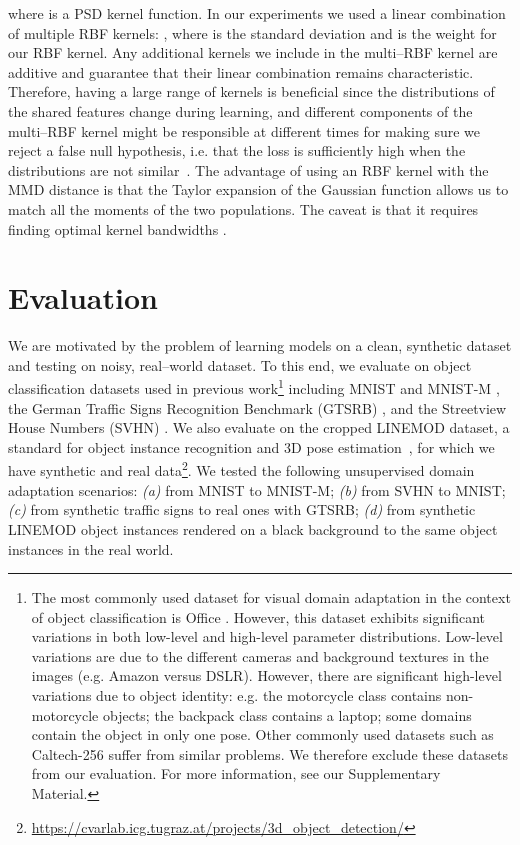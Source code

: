 \documentclass{article}
\begin{document}
where  is a PSD kernel function. In our experiments we used a linear combination of multiple RBF kernels: , where  is the standard deviation and  is the weight for our  RBF kernel. Any additional kernels we include in the multi--RBF kernel are additive and guarantee that their linear combination remains characteristic. Therefore, having a large range of kernels is beneficial since the distributions of the shared features change during learning, and different components of the multi--RBF kernel might be responsible at different times for making sure we reject a false null hypothesis, i.e. that the loss is sufficiently high when the distributions are not similar~\cite{long2015learning}. The advantage of using an RBF kernel with the MMD distance is that the Taylor expansion of the Gaussian function allows us to match all the moments of the two populations. The caveat is that it requires finding optimal kernel bandwidths .







 \section{Evaluation}
\label{sec:experiments}
\vspace{-4mm}






We are motivated by the problem of learning models on a clean, synthetic dataset and testing on
noisy, real–world dataset. To this end, we evaluate on object classification datasets used in previous work\footnote{The most commonly used dataset for visual domain adaptation in the context of object classification is Office \cite{saenko2010adapting}. However, this dataset exhibits significant variations in both low-level and high-level parameter distributions. Low-level variations are due to the different cameras and background textures in the images (e.g. Amazon versus DSLR). However, there are significant high-level variations due to object identity: e.g. the motorcycle class contains non-motorcycle objects; the backpack class contains a laptop; some domains contain the object in only one pose. Other commonly used datasets such as Caltech-256 suffer from similar problems. We therefore exclude these datasets from our evaluation. For more information, see our Supplementary Material.}
including MNIST and {MNIST-M} \cite{ganin2016domain}, the German Traffic Signs
Recognition Benchmark (GTSRB) \cite{stallkamp2012gtsrb}, and the Streetview
House Numbers (SVHN) \cite{netzer2011reading}. We also evaluate on the cropped
LINEMOD dataset, a standard for object instance
recognition and 3D pose 
estimation~\cite{hinterstoisser2012accv,wohlhart2015learning}, for which we have
synthetic and real data\footnote{\url{https://cvarlab.icg.tugraz.at/projects/3d_object_detection/}}.
We tested the following unsupervised domain adaptation scenarios: \textsl{(a)} from MNIST to MNIST-M; \textsl{(b)} from SVHN to MNIST; \textsl{(c)} from synthetic traffic signs to real ones with GTSRB; \textsl{(d)} from synthetic LINEMOD object instances rendered on a black background to the same object instances in the real world.
\end{document}
